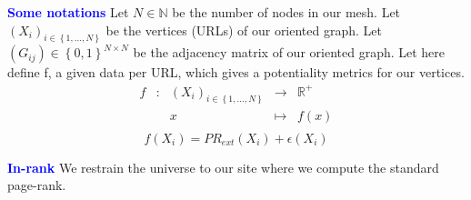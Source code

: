 \documentclass[a4, 14pts]{seminar}
\begin{document}
	    {\small{
	    \begin{slide}
	    \slidecontents
	    \renewcommand\theslideheading{Plan}
	    \end{slide}
	    \begin{slide}
	    \textbf{\textcolor{blue}{\large Some notations}}\newline
	    Let $N\in\mathbb{N}$ be the number of nodes in our mesh.
	    \newline
	    Let $\left(X_i\right)_{i \in \left\{1,...,N\right\}}$ be the vertices (URLs) of our oriented graph.
	    \newline
	    Let $\left(G_{ij}\right)  \in \left\{0,1\right\}^{N\times N}$ be the adjacency matrix of our oriented graph.
	    \newline
	    Let here define f, a given data per URL, which gives a potentiality metrics for our vertices.
	    \begin{equation}
	    \begin{array}{ccccc}
	    f & : & \left(X_i\right)_{i \in \left\{1,...,N\right\}} & \to & \mathbb{R}^{+} \\
	    & & x & \mapsto & f(x) \\
	    \end{array}
	    \end{equation}
	     \begin{equation}
	    f(X_i) = PR_{ext}(X_i) +  \epsilon \left(X_i\right)
	    \end{equation}
	    \end{slide}
	    \begin{slide}
	    \textbf{\textcolor{blue}{\large In-rank}}\newline      
	    We restrain the universe to our site where we compute the standard page-rank.

\end{slide}}}
\end{document}
